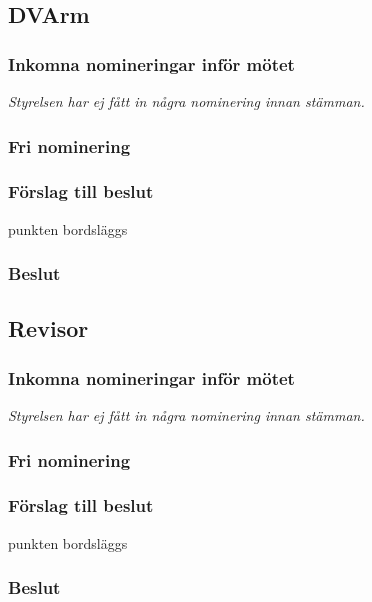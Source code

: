 \documentclass[protokoll]{dvd}
\begin{document}
\subsection*{DVArm}
\subsubsection*{Inkomna nomineringar inför mötet}
\textit{Styrelsen har ej fått in några nominering innan stämman.}
\subsubsection*{Fri nominering}
\subsubsection*{Förslag till beslut}
\begin{attsatser}
    \item punkten bordsläggs
\end{attsatser}
\subsubsection*{Beslut}
\begin{attsatser}
    \item 
\end{attsatser}

\subsection*{Revisor}
\subsubsection*{Inkomna nomineringar inför mötet}
\textit{Styrelsen har ej fått in några nominering innan stämman.}
\subsubsection*{Fri nominering}
\subsubsection*{Förslag till beslut}
\begin{attsatser}
    \item punkten bordsläggs
\end{attsatser}
\subsubsection*{Beslut}
\begin{attsatser}
    \item 
\end{attsatser}
\end{document}
